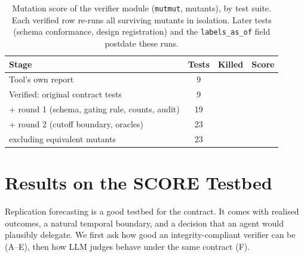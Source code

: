 \documentclass[conference]{IEEEtran}
\begin{document}

\begin{table}[t]\centering
\caption{Mutation score of the verifier module (\textnormal{\texttt{mutmut}}, \mutTotal{} mutants), by test suite. Each verified row re-runs all surviving mutants in isolation. Later tests (schema conformance, design registration) and the \texttt{labels\_as\_of} field postdate these runs.}\label{tab:mutstages}
\scriptsize\setlength{\tabcolsep}{4pt}\begin{tabular}{@{}lccc@{}}\toprule
Stage & Tests & Killed & Score \\\midrule
Tool's own report & 9 & \mutToolKilled{} & \mutToolScore{} \\
Verified: original contract tests & 9 & \mutVoneKilled{} & \mutVoneScore{} \\
\quad + round 1 (schema, gating rule, counts, audit) & 19 & \mutVtwoKilled{} & \mutVtwoScore{} \\
\quad + round 2 (cutoff boundary, oracles) & 23 & \mutVthreeKilled{} & \mutVthreeScore{} \\
\quad excluding \mutClsEquivalent{} equivalent mutants & 23 & \mutVthreeKilled{} & \mutVthreeExEq{} \\
\bottomrule\end{tabular}\end{table}

\section{Results on the SCORE Testbed}\label{sec:results}
Replication forecasting is a good testbed for the contract. It comes with realised outcomes, a natural temporal boundary, and a decision that an agent would plausibly delegate. We first ask how good an integrity-compliant verifier can be (A--E), then how LLM judges behave under the same contract (F).

\end{document}
